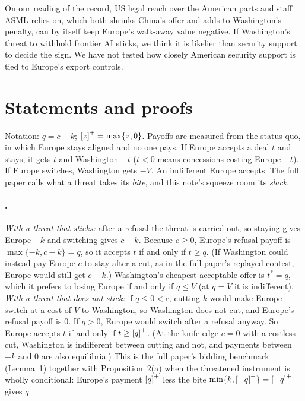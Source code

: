 \documentclass[11pt]{article}
\begin{document}
On our reading of the record, US legal reach over the American parts and staff ASML relies on, which both shrinks China's offer and adds to Washington's penalty, can by itself keep Europe's walk-away value negative. If Washington's threat to withhold frontier AI sticks, we think it is likelier than security support to decide the sign. We have not tested how closely American security support is tied to Europe's export controls.

{\raggedright


}

\appendix
\section{Statements and proofs}

Notation: $q=c-k$; $\left[z\right]^{+}=\max\{z,0\}$. Payoffs are measured from the status quo, in which Europe stays aligned and no one pays. If Europe accepts a deal $t$ and stays, it gets $t$ and Washington $-t$ ($t<0$ means concessions costing Europe $-t$). If Europe switches, Washington gets $-V$. An indifferent Europe accepts. The full paper calls what a threat takes its \emph{bite}, and this note's squeeze room its \emph{slack}.

\paragraph{.} \emph{With a threat that sticks:} after a refusal the threat is carried out, so staying gives Europe $-k$ and switching gives $c-k$. Because $c\ge 0$, Europe's refusal payoff is $\max\{-k,c-k\}=q$, so it accepts $t$ if and only if $t\ge q$. (If Washington could instead pay Europe $c$ to stay after a cut, as in the full paper's replayed contest, Europe would still get $c-k$.) Washington's cheapest acceptable offer is $t^*=q$, which it prefers to losing Europe if and only if $q\le V$ (at $q=V$ it is indifferent). \emph{With a threat that does not stick:} if $q\le 0<c$, cutting $k$ would make Europe switch at a cost of $V$ to Washington, so Washington does not cut, and Europe's refusal payoff is $0$. If $q>0$, Europe would switch after a refusal anyway. So Europe accepts $t$ if and only if $t\ge\left[q\right]^{+}$. (At the knife edge $c=0$ with a costless cut, Washington is indifferent between cutting and not, and payments between $-k$ and $0$ are also equilibria.) This is the full paper's bidding benchmark (Lemma~1) together with Proposition~2(a) when the threatened instrument is wholly conditional: Europe's payment $\left[q\right]^{+}$ less the bite $\min\{k,\left[-q\right]^{+}\}=\left[-q\right]^{+}$ gives $q$.
\end{document}
